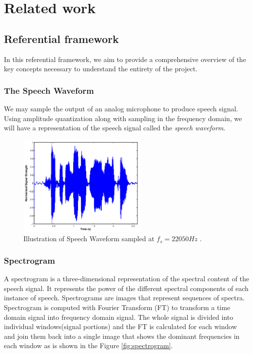 \chapter{Related work}

\section{Referential framework}

In this referential framework, we aim to provide a comprehensive overview of the key concepts necessary to understand the entirety of the project.

\subsection{The Speech Waveform}
We may sample the output of an analog microphone to produce speech signal. Using amplitude quantization along with sampling in the frequency domain, we will have a representation of the speech signal called the \textit{speech waveform}\cite{beigi2011speaker}.

\begin{figure}[htbp!]
    \centering
    \includegraphics[height=5cm]{figures/speech_waveform.png}
    \caption{Illustration of Speech Waveform sampled at $f_s = 22050 Hz$ \cite{beigi2011speaker}.}
    \label{fig:wave_form}
\end{figure}

\subsection{Spectrogram}
A spectrogram is a three-dimensional representation of the spectral content of the speech signal. It represents the power of the different spectral components of each instance of speech. Spectrograms are images that represent sequences of spectra. Spectrogram is computed with Fourier Transform (FT) to transform a time domain signal into frequency domain signal. The whole signal is divided into individual windows(signal portions) and the FT is calculated for each window and join them back into a single image that shows the dominant frequencies in
each window \cite{sribhashyam2021pattern, wyse2017audio} as is shown in the Figure \ref{fig:spectrogram}.

